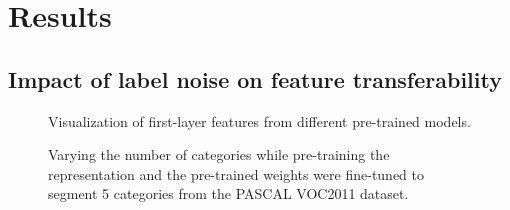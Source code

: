 \section{Results}
\label{sec:results}
\subsection{Impact of label noise on feature transferability}



\begin{figure}[t]
\centering
\fbox{\rule{0pt}{2in} \rule{0.9\linewidth}{0pt}}
\caption{Visualization of first-layer features from different pre-trained models.}
\label{fig:features}
\end{figure}

\begin{figure}[t]
\centering
\fbox{\rule{0pt}{2in} \rule{0.9\linewidth}{0pt}}
\caption{Varying the number of categories while pre-training the representation and the pre-trained weights were fine-tuned to segment 5 categories from the PASCAL VOC2011 dataset.}
\label{fig:categories}
\end{figure}

